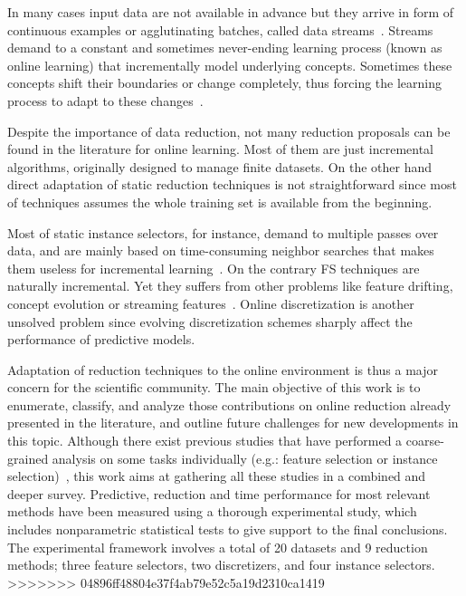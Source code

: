 \documentclass[preprint,12pt]{elsarticle}
\begin{document}
In many cases input data are not available in advance but they arrive in form of continuous examples or agglutinating batches, called data streams~\cite{gama10}. Streams demand to a constant and sometimes never-ending learning process (known as online learning) that incrementally model underlying concepts. Sometimes these concepts shift their boundaries or change completely, thus forcing the learning process to adapt to these changes~\cite{gama14}.

Despite the importance of data reduction, not many reduction proposals can be found in the literature for online learning. Most of them are just incremental algorithms, originally designed to manage finite datasets. On the other hand direct adaptation of static reduction techniques is not straightforward since most of techniques assumes the whole training set is available from the beginning. 

Most of static instance selectors, for instance, demand to multiple passes over data, and are mainly based on time-consuming neighbor searches that makes them useless for incremental learning~\cite{garcia14}. On the contrary FS techniques are naturally incremental. Yet they suffers from other problems like feature drifting, concept evolution or streaming features~\cite{masud10}. Online discretization is another unsolved problem since evolving discretization schemes sharply affect the performance of predictive models. 

Adaptation of reduction techniques to the online environment is thus a major concern for the scientific community. The main objective of this work is to enumerate, classify, and analyze those contributions on online reduction already presented in the literature, and outline future challenges for new developments in this topic. Although there exist previous studies that have performed a coarse-grained analysis on some tasks individually (e.g.: feature selection or instance selection)~\cite{bolon15, lu16}, this work aims at gathering all these studies in a combined and deeper survey. Predictive, reduction and time performance for most relevant methods have been measured using a thorough experimental study, which includes nonparametric statistical tests to give support to the final conclusions. The experimental framework involves a total of 20 datasets and 9 reduction methods; three feature selectors, two discretizers, and four instance selectors.
>>>>>>> 04896ff48804e37f4ab79e52c5a19d2310ca1419

\end{document}
